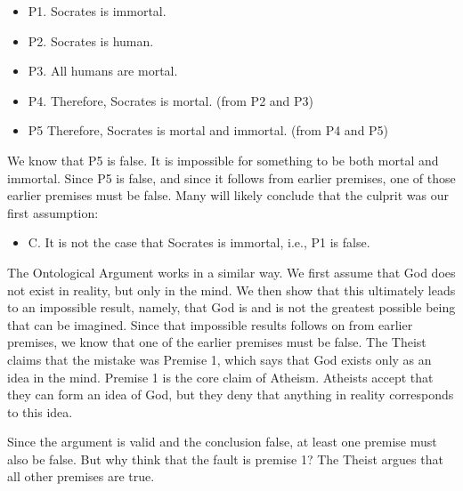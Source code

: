 \documentclass[]{article}
\begin{document}
\begin{itemize}
\itemsep1pt\parskip0pt
\item
  P1. Socrates is immortal.
\item
  P2. Socrates is human.
\item
  P3. All humans are mortal.
\item
  P4. Therefore, Socrates is mortal. (from P2 and P3)
\item
  P5 Therefore, Socrates is mortal and immortal. (from P4 and P5)
\end{itemize}

We know that P5 is false. It is impossible for something to be both
mortal and immortal. Since P5 is false, and since it follows from
earlier premises, one of those earlier premises must be false. Many will
likely conclude that the culprit was our first assumption:

\begin{itemize}
\itemsep1pt\parskip0pt
\item
  C. It is not the case that Socrates is immortal, i.e., P1 is false.
\end{itemize}

The Ontological Argument works in a similar way. We first assume that
God does not exist in reality, but only in the mind. We then show that
this ultimately leads to an impossible result, namely, that God is and
is not the greatest possible being that can be imagined. Since that
impossible results follows on from earlier premises, we know that one of
the earlier premises must be false. The Theist claims that the mistake
was Premise 1, which says that God exists only as an idea in the mind.
Premise 1 is the core claim of Atheism. Atheists accept that they can
form an idea of God, but they deny that anything in reality corresponds
to this idea.

Since the argument is valid and the conclusion false, at least one
premise must also be false. But why think that the fault is premise 1?
The Theist argues that all other premises are true.
\end{document}
